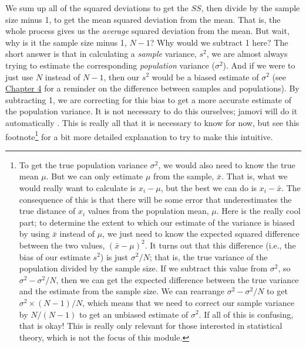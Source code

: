 \documentclass[
]{scrbook}
\begin{document}
We sum up all of the squared deviations to get the \(SS\), then divide by the sample size minus 1, to get the mean squared deviation from the mean.
That is, the whole process gives us the \emph{average} squared deviation from the mean.
But wait, why is it the sample size minus 1, \(N - 1\)?
Why would we subtract 1 here?
The short answer is that in calculating a \emph{sample} variance, \(s^{2}\), we are almost always trying to estimate the corresponding \emph{population} variance (\(\sigma^{2}\)).
And if we were to just use \(N\) instead of \(N - 1\), then our \(s^{2}\) would be a biased estimate of \(\sigma^{2}\) (see \protect\hyperlink{Chapter_4}{Chapter 4} for a reminder on the difference between samples and populations).
By subtracting 1, we are correcting for this bias to get a more accurate estimate of the population variance.
It is not necessary to do this ourselves; jamovi will do it automatically \citep{Jamovi2022}.
This is really all that it is necessary to know for now, but see this footnote\footnote{To get the true population variance \(\sigma^{2}\), we would also need to know the true mean \(\mu\). But we can only estimate \(\mu\) from the sample, \(\bar{x}\). That is, what we would really want to calculate is \(x_{i} - \mu\), but the best we can do is \(x_{i} - \bar{x}\). The consequence of this is that there will be some error that underestimates the true distance of \(x_{i}\) values from the population mean, \(\mu\). Here is the really cool part; to determine the extent to which our estimate of the variance is biased by using \(\bar{x}\) instead of \(\mu\), we just need to know the expected squared difference between the two values, \((\bar{x} - \mu)^{2}\). It turns out that this difference (i.e., the bias of our estimate \(s^{2}\)) is just \(\sigma^{2} / N\); that is, the true variance of the population divided by the sample size. If we subtract this value from \(\sigma^{2}\), so \(\sigma^{2} - \sigma^{2}/N\), then we can get the expected difference between the true variance and the estimate from the sample size. We can rearrange \(\sigma^{2} - \sigma^{2}/N\) to get \(\sigma^{2} \times (N - 1)/N\), which means that we need to correct our sample variance by \(N / (N-1)\) to get an unbiased estimate of \(\sigma^{2}\). If all of this is confusing, that is okay! This is really only relevant for those interested in statistical theory, which is not the focus of this module.} for a bit more detailed explanation to try to make this intuitive.
\end{document}
